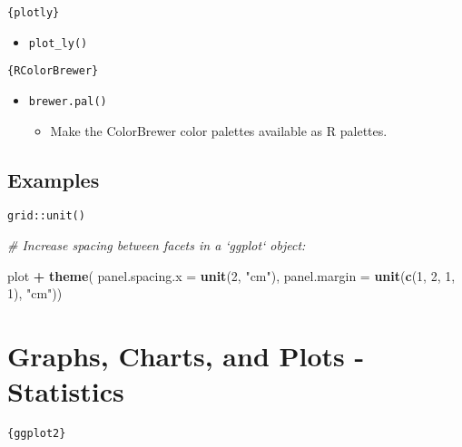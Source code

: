 \documentclass[
]{book}
\newenvironment{Shaded}{\begin{snugshade}}{\end{snugshade}}
\newcommand{\CommentTok}[1]{\textcolor[rgb]{0.56,0.35,0.01}{\textit{#1}}}
\newcommand{\DataTypeTok}[1]{\textcolor[rgb]{0.13,0.29,0.53}{#1}}
\newcommand{\DecValTok}[1]{\textcolor[rgb]{0.00,0.00,0.81}{#1}}
\newcommand{\KeywordTok}[1]{\textcolor[rgb]{0.13,0.29,0.53}{\textbf{#1}}}
\newcommand{\NormalTok}[1]{#1}
\newcommand{\OperatorTok}[1]{\textcolor[rgb]{0.81,0.36,0.00}{\textbf{#1}}}
\newcommand{\StringTok}[1]{\textcolor[rgb]{0.31,0.60,0.02}{#1}}
\providecommand{\tightlist}{%
  \setlength{\itemsep}{0pt}\setlength{\parskip}{0pt}}
\begin{document}
\texttt{\{plotly\}}

\begin{itemize}
\tightlist
\item
  \texttt{plot\_ly()}
\end{itemize}

\texttt{\{RColorBrewer\}}

\begin{itemize}
\tightlist
\item
  \texttt{brewer.pal()}

  \begin{itemize}
  \tightlist
  \item
    Make the ColorBrewer color palettes available as R palettes.
  \end{itemize}
\end{itemize}

\hypertarget{examples-5}{%
\subsection{Examples}\label{examples-5}}

\texttt{grid::unit()}

\begin{Shaded}
\begin{Highlighting}[]
\CommentTok{# Increase spacing between facets in a `ggplot` object:}

\NormalTok{plot }\OperatorTok{+}\StringTok{ }
\StringTok{  }\KeywordTok{theme}\NormalTok{(}
    \DataTypeTok{panel.spacing.x =} \KeywordTok{unit}\NormalTok{(}\DecValTok{2}\NormalTok{, }\StringTok{"cm"}\NormalTok{),}
    \DataTypeTok{panel.margin =} \KeywordTok{unit}\NormalTok{(}\KeywordTok{c}\NormalTok{(}\DecValTok{1}\NormalTok{, }\DecValTok{2}\NormalTok{, }\DecValTok{1}\NormalTok{, }\DecValTok{1}\NormalTok{), }\StringTok{"cm"}\NormalTok{))}
\end{Highlighting}
\end{Shaded}

\hypertarget{graphs-charts-and-plots---statistics}{%
\section{Graphs, Charts, and Plots - Statistics}\label{graphs-charts-and-plots---statistics}}

\texttt{\{ggplot2\}}
\end{document}
